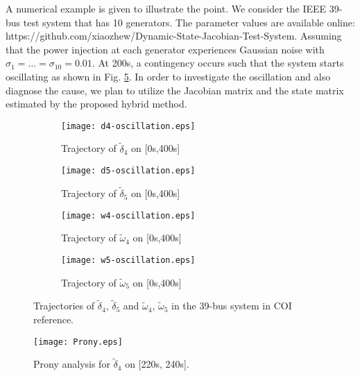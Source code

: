 \documentclass[journal]{IEEEtran}
\begin{document}
A numerical example is given to illustrate the point. We consider the IEEE 39-bus test system that has 10 generators. The parameter values are available online: https://github.com/xiaozhew/Dynamic-State-Jacobian-Test-System. Assuming that the power injection at each generator experiences Gaussian noise with $\sigma_1=...=\sigma_{10}=0.01$. At 200s, a contingency occurs such that the system starts oscillating as shown in Fig. \ref{39-oscillation}. In order to investigate the oscillation and also diagnose the cause, we plan to utilize the Jacobian matrix and the state matrix estimated by the proposed hybrid method.
\begin{figure}[!ht]
\centering
\begin{subfigure}[t]{0.52\linewidth}
\texttt{[image: d4-oscillation.eps]}
\caption{Trajectory of $\tilde{\delta}_{4}$ on [0s,400s]}\label{d4-oscillation}
\end{subfigure}\begin{subfigure}[t]{0.48\linewidth}
\texttt{[image: d5-oscillation.eps]}
\caption{Trajectory of $\tilde{\delta}_{5}$ on [0s,400s]}\label{d5-oscillation}
\end{subfigure}
\begin{subfigure}[t]{0.5\linewidth}
\texttt{[image: w4-oscillation.eps]}
\caption{Trajectory of $\tilde{\omega}_{4}$ on [0s,400s]}\label{w4-oscillation}
\end{subfigure}\begin{subfigure}[t]{0.5\linewidth}
\texttt{[image: w5-oscillation.eps]}
\caption{Trajectory of $\tilde{\omega}_{5}$ on [0s,400s]}\label{w5-oscillation}
\end{subfigure}
\caption{Trajectories of $\tilde{\delta}_{4}$, $\tilde{\delta}_{5}$ and $\tilde{\omega}_{4}$, $\tilde{\omega}_{5}$ in the 39-bus system in COI reference.}\label{39-oscillation}
\end{figure}

\begin{figure*}
\centering
\texttt{[image: Prony.eps]}
\caption{Prony analysis for $\tilde{\delta}_{4}$ on [220s, 240s].} \label{prony}
\end{figure*}
\end{document}
